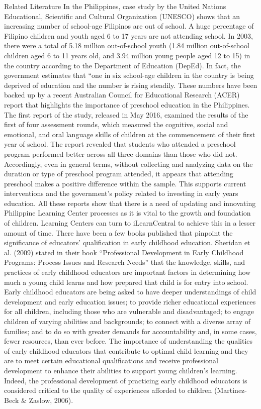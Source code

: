 Related Literature
In the Philippines, case study by the United Nations Educational, Scientific and Cultural Organization (UNESCO) shows that an increasing number of school-age Filipinos are out of school. A huge percentage of Filipino children and youth aged 6 to 17 years are not attending school. In 2003, there were a total of 5.18 million out-of-school youth (1.84 million out-of-school children aged 6 to 11 years old, and 3.94 million young people aged 12 to 15) in the country according to the Department of Education (DepEd). In fact, the government estimates that “one in six school-age children in the country is being deprived of education and the number is rising steadily. These numbers have been backed up by a recent Australian Council for Educational Research (ACER) report that highlights the importance of preschool education in the Philippines. The first report of the study, released in May 2016, examined the results of the first of four assessment rounds, which measured the cognitive, social and emotional, and oral language skills of children at the commencement of their first year of school.
The report revealed that students who attended a preschool program performed better across all three domains than those who did not. Accordingly, even in general terms, without collecting and analyzing data on the duration or type of preschool program attended, it appears that attending preschool makes a positive difference within the sample. This supports current interventions and the government’s policy related to investing in early years education. 
All these reports show that there is a need of updating and innovating Philippine Learning Center processes as it is vital to the growth and foundation of children. Learning Centers can turn to iLearnCentral to achieve this in a lesser amount of time.
There have been a few books published that pinpoint the significance of educators’ qualification in early childhood education. Sheridan et al. (2009) stated in their book “Professional  
Development in Early Childhood Programs: Process Issues and Research Needs” that the knowledge, skills, and practices of early childhood educators are important factors in determining how much a young child learns and how prepared that child is for entry into school. Early childhood educators are being asked to have deeper understandings of child development and early education issues; to provide richer educational experiences for all children, including those who are vulnerable and disadvantaged; to engage children of varying abilities and backgrounds; to connect with a diverse array of families; and to do so with greater demands for accountability and, in some cases, fewer resources, than ever before. The importance of understanding the qualities of early childhood educators that contribute to optimal child learning and they are to meet certain educational qualifications and receive professional development to enhance their abilities to support young children's learning. Indeed, the professional development of practicing early childhood educators is considered critical to the quality of experiences afforded to children (Martinez-Beck & Zaslow, 2006).
